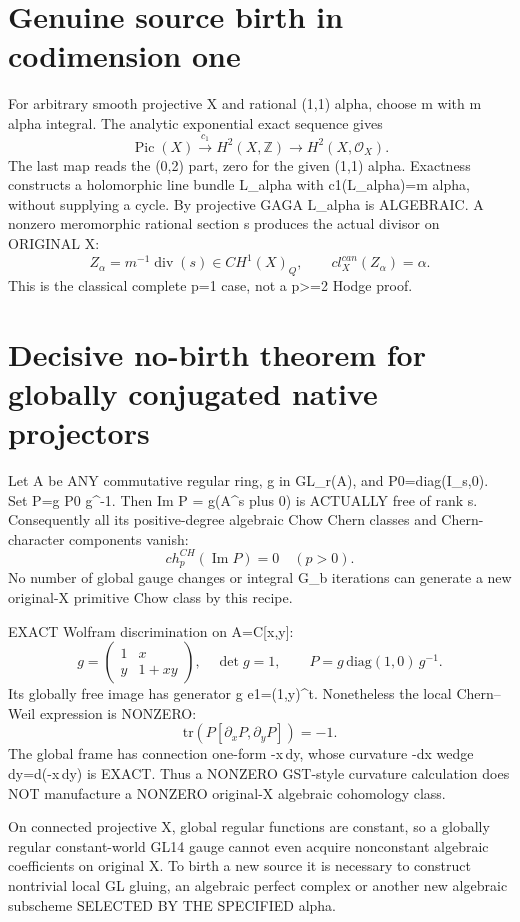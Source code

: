 \documentclass{article}
\begin{document}
\section{Genuine source birth in codimension one}
For arbitrary smooth projective X and rational (1,1) alpha,
choose m with m alpha integral. The analytic exponential exact
sequence gives
\[
\operatorname{Pic}(X)\overset{c_1}{\longrightarrow}
 H^2(X,\mathbb Z)\longrightarrow H^2(X,\mathcal O_X).
\]
The last map reads the (0,2) part, zero for the given (1,1) alpha.
Exactness constructs a holomorphic line bundle L_alpha with
c1(L_alpha)=m alpha, without supplying a cycle. By projective GAGA
L_alpha is ALGEBRAIC. A nonzero meromorphic rational section s
produces the actual divisor on ORIGINAL X:
\[
\boxed{Z_\alpha=m^{-1}\operatorname{div}(s)\in CH^1(X)_Q,\qquad
cl_X^{can}(Z_\alpha)=\alpha.}
\]
This is the classical complete p=1 case, not a p>=2 Hodge proof.

\section{Decisive no-birth theorem for globally conjugated native projectors}
Let A be ANY commutative regular ring, g in GL_r(A), and
P0=diag(I_s,0). Set P=g P0 g^{-1}.
Then Im P = g(A^s plus 0) is ACTUALLY free of rank s.
Consequently all its positive-degree algebraic Chow Chern classes
and Chern-character components vanish:
\[
\boxed{ch_p^{CH}(\operatorname{Im}P)=0\quad(p>0).}
\]
No number of global gauge changes or integral G_b iterations
can generate a new original-X primitive Chow class by this recipe.

EXACT Wolfram discrimination on A=C[x,y]:
\[
g=\begin{pmatrix}1&x\\y&1+xy\end{pmatrix},\quad \det g=1,
\qquad P=g\,\mathrm{diag}(1,0)\,g^{-1}.
\]
Its globally free image has generator g e1=(1,y)^t.
Nonetheless the local Chern--Weil expression is NONZERO:
\[
\mathrm{tr}(P[\partial_xP,\partial_yP])=-1.
\]
The global frame has connection one-form -x\,dy, whose
curvature -dx wedge dy=d(-x\,dy) is EXACT. Thus a NONZERO
GST-style curvature calculation does NOT manufacture a
NONZERO original-X algebraic cohomology class.

On connected projective X, global regular functions are constant,
so a globally regular constant-world GL14 gauge cannot even acquire
nonconstant algebraic coefficients on original X. To birth a
new source it is necessary to construct nontrivial local GL gluing,
an algebraic perfect complex or another new algebraic subscheme
SELECTED BY THE SPECIFIED alpha.
\end{document}
